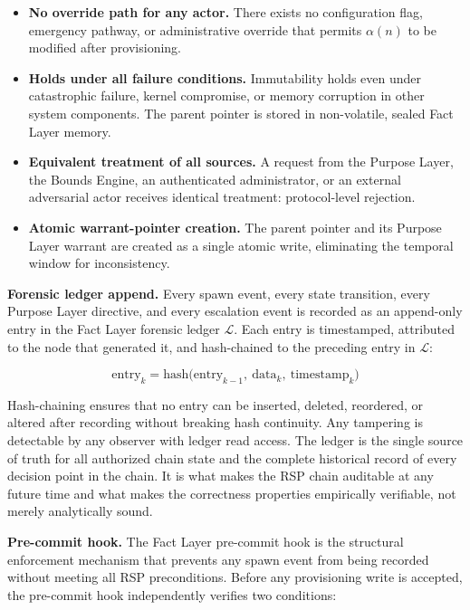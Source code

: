\begin{itemize}
    \item[(I1)] \textbf{No override path for any actor.} There exists no configuration flag, emergency pathway, or administrative override that permits $\alpha(n)$ to be modified after provisioning.
    \item[(I2)] \textbf{Holds under all failure conditions.} Immutability holds even under catastrophic failure, kernel compromise, or memory corruption in other system components. The parent pointer is stored in non-volatile, sealed Fact Layer memory.
    \item[(I3)] \textbf{Equivalent treatment of all sources.} A request from the Purpose Layer, the Bounds Engine, an authenticated administrator, or an external adversarial actor receives identical treatment: protocol-level rejection.
    \item[(I4)] \textbf{Atomic warrant-pointer creation.} The parent pointer and its Purpose Layer warrant are created as a single atomic write, eliminating the temporal window for inconsistency.
\end{itemize}

\medskip
\noindent\textbf{Forensic ledger append.} Every spawn event, every state transition, every Purpose Layer directive, and every escalation event is recorded as an append-only entry in the Fact Layer forensic ledger $\mathcal{L}$. Each entry is timestamped, attributed to the node that generated it, and hash-chained to the preceding entry in $\mathcal{L}$:

\begin{equation}
    \mathrm{entry}_k = \mathrm{hash}\bigl(\mathrm{entry}_{k-1},\ \mathrm{data}_k,\ \mathrm{timestamp}_k\bigr)
    \label{eq:ledger-hash-chain}
\end{equation}

Hash-chaining ensures that no entry can be inserted, deleted, reordered, or altered after recording without breaking hash continuity. Any tampering is detectable by any observer with ledger read access. The ledger is the single source of truth for all authorized chain state and the complete historical record of every decision point in the chain. It is what makes the RSP chain auditable at any future time and what makes the correctness properties empirically verifiable, not merely analytically sound.

\medskip
\noindent\textbf{Pre-commit hook.} The Fact Layer pre-commit hook is the structural enforcement mechanism that prevents any spawn event from being recorded without meeting all RSP preconditions. Before any provisioning write is accepted, the pre-commit hook independently verifies two conditions:

